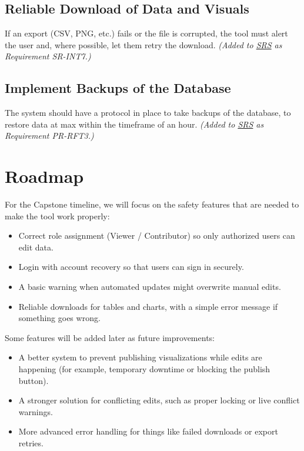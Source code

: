 \documentclass{article}
\begin{document}
\subsection*{Reliable Download of Data and Visuals}
If an export (CSV, PNG, etc.) fails or the file is corrupted, the tool must alert the user and, where possible, let them retry the download. \textit{(Added to \href{https://github.com/thaafei/DomainX/blob/main/docs/SRS/SRS.pdf}{SRS} as Requirement SR-INT7.)}

\subsection*{Implement Backups of the Database}
The system should have a protocol in place to take backups of the database, to restore data at max within the timeframe of an hour. \textit{(Added to \href{https://github.com/thaafei/DomainX/blob/main/docs/SRS/SRS.pdf}{SRS} as Requirement PR-RFT3.)}

\section{Roadmap}

For the Capstone timeline, we will focus on the safety features that are needed to make the tool work properly:

\begin{itemize}
    \item Correct role assignment (Viewer / Contributor) so only authorized users can edit data.
    \item Login with account recovery so that users can sign in securely.
    \item A basic warning when automated updates might overwrite manual edits.
    \item Reliable downloads for tables and charts, with a simple error message if something goes wrong.
\end{itemize}

Some features will be added later as future improvements:

\begin{itemize}
    \item A better system to prevent publishing visualizations while edits are happening (for example, temporary downtime or blocking the publish button).
    \item A stronger solution for conflicting edits, such as proper locking or live conflict warnings.
    \item More advanced error handling for things like failed downloads or export retries.
\end{itemize}
\end{document}
